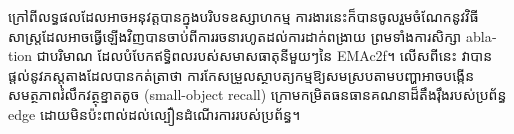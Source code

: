 \begin{khmer}
ក្រៅពីលទ្ធផលដែលអាចអនុវត្តបានក្នុងបរិបទឧស្សាហកម្ម ការងារនេះក៏បានចូលរួមចំណែកនូវវិធីសាស្ត្រដែលអាចធ្វើឡើងវិញបានចាប់ពីការរចនារហូតដល់ការដាក់ពង្រាយ ព្រមទាំងការសិក្សា \textenglish{ablation} ជាបរិមាណ ដែលបំបែកឥទ្ធិពលរបស់សមាសធាតុនីមួយៗនៃ \textenglish{EMAc2f}។ លើសពីនេះ វាបានផ្តល់នូវភស្តុតាងដែលបានកត់ត្រាថា ការកែសម្រួលស្ថាបត្យកម្មឱ្យសមស្របតាមបញ្ហាអាចបង្កើនសមត្ថភាពរំលឹកវត្ថុខ្នាតតូច (\textenglish{small-object recall}) ក្រោមកម្រិតធនធានគណនាដ៏តឹងរ៉ឹងរបស់ប្រព័ន្ធ \textenglish{edge} ដោយមិនប៉ះពាល់ដល់ល្បឿនដំណើរការរបស់ប្រព័ន្ធ។
\end{khmer}
